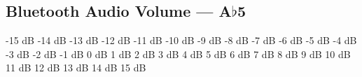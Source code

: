 \subsection[Bluetooth Audio Volume]{Bluetooth Audio Volume --- \UiKey{\SET}A$\flat$5}


























-15 dB
-14 dB
-13 dB
-12 dB
-11 dB
-10 dB
-9 dB
-8 dB
-7 dB
-6 dB
-5 dB
-4 dB
-3 dB
-2 dB
-1 dB
0 dB
1 dB
2 dB
3 dB
4 dB
5 dB
6 dB
7 dB
8 dB
9 dB
10 dB
11 dB
12 dB
13 dB
14 dB
15 dB

